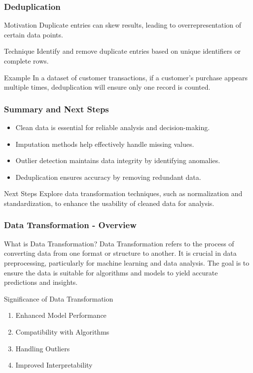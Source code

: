 \documentclass[aspectratio=169]{beamer}
\begin{document}
\begin{frame}[fragile]
    \frametitle{Deduplication}
    \begin{block}{Motivation}
        Duplicate entries can skew results, leading to overrepresentation of certain data points.
    \end{block}
    \begin{block}{Technique}
        Identify and remove duplicate entries based on unique identifiers or complete rows.
    \end{block}
    \begin{block}{Example}
        In a dataset of customer transactions, if a customer's purchase appears multiple times, deduplication will ensure only one record is counted.
    \end{block}
\end{frame}

\begin{frame}[fragile]
    \frametitle{Summary and Next Steps}
    \begin{itemize}
        \item Clean data is essential for reliable analysis and decision-making.
        \item Imputation methods help effectively handle missing values.
        \item Outlier detection maintains data integrity by identifying anomalies.
        \item Deduplication ensures accuracy by removing redundant data.
    \end{itemize}
    \begin{block}{Next Steps}
        Explore data transformation techniques, such as normalization and standardization, to enhance the usability of cleaned data for analysis.
    \end{block}
\end{frame}

\begin{frame}[fragile]
    \frametitle{Data Transformation - Overview}
    \begin{block}{What is Data Transformation?}
        Data Transformation refers to the process of converting data from one format or structure to another.
        It is crucial in data preprocessing, particularly for machine learning and data analysis.
        The goal is to ensure the data is suitable for algorithms and models to yield accurate predictions and insights.
    \end{block}
    
    \begin{block}{Significance of Data Transformation}
        \begin{enumerate}
            \item Enhanced Model Performance
            \item Compatibility with Algorithms
            \item Handling Outliers
            \item Improved Interpretability
        \end{enumerate}
    \end{block}
\end{frame}
\end{document}
